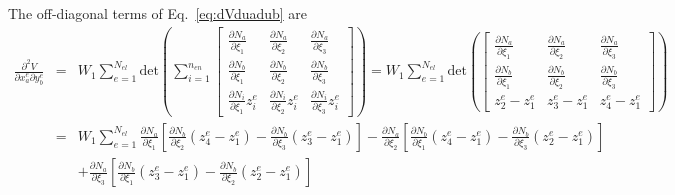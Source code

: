 The off-diagonal terms of Eq.\ \eqref{eq:dVduadub} are
%
\begin{eqnarray}
\frac{\partial^2 V}{\partial x_a^e \partial y_b^e} &=&W_1 \sum_{e=1}^{N_{el}} \text{det}\left(\sum_{i=1}^{n_{en}}
%
\begin{bmatrix}
\frac{\partial N_a}{\partial \xi_1}  & \frac{\partial N_a}{\partial \xi_2} & \frac{\partial N_a}{\partial \xi_3}  \\
%
\frac{\partial N_b}{\partial \xi_1}  & \frac{\partial N_b}{\partial \xi_2} & \frac{\partial N_b}{\partial \xi_3}  \\
%
\frac{\partial N_i}{\partial \xi_1}z_i^e  & \frac{\partial N_i}{\partial \xi_2}z_i^e & \frac{\partial N_i}{\partial \xi_3}z_i^e 
\end{bmatrix}\right) 
%
=W_1 \sum_{e=1}^{N_{el}} \text{det}\left(
%
\begin{bmatrix}
\frac{\partial N_a}{\partial \xi_1}  & \frac{\partial N_a}{\partial \xi_2} & \frac{\partial N_a}{\partial \xi_3}  \\
%
\frac{\partial N_b}{\partial \xi_1}  & \frac{\partial N_b}{\partial \xi_2} & \frac{\partial N_b}{\partial \xi_3}  \\
%
z_2^e - z_1^e & z_3^e - z_1^e & z_4^e - z_1^e 
\end{bmatrix}\right)\nonumber\\
&=& W_1\sum_{e=1}^{N_{el}}\frac{\partial N_a}{\partial \xi_1}\left[\frac{\partial N_b}{\partial \xi_2}(z_4^e - z_1^e)-\frac{\partial N_b}{\partial \xi_3}(z_3^e - z_1^e)\right]
%
-\frac{\partial N_a}{\partial \xi_2}\left[\frac{\partial N_b}{\partial \xi_1}(z_4^e - z_1^e)-\frac{\partial N_b}{\partial \xi_3}(z_2^e - z_1^e)\right] \nonumber\\
%
&&+\frac{\partial N_a}{\partial \xi_3}\left[\frac{\partial N_b}{\partial \xi_1}(z_3^e - z_1^e)-\frac{\partial N_b}{\partial \xi_2}(z_2^e - z_1^e)\right] 
\end{eqnarray}
